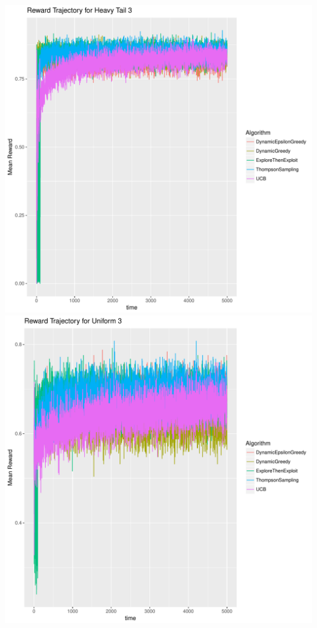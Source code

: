 \documentclass[11pt,letterpaper]{article}
\begin{document}
\includegraphics[scale=0.5]{"../results/Reward Trajectory for Heavy Tail 3"}
\\
\includegraphics[scale=0.5]{"../results/Reward Trajectory for Uniform 3"}
\\
\end{document}
